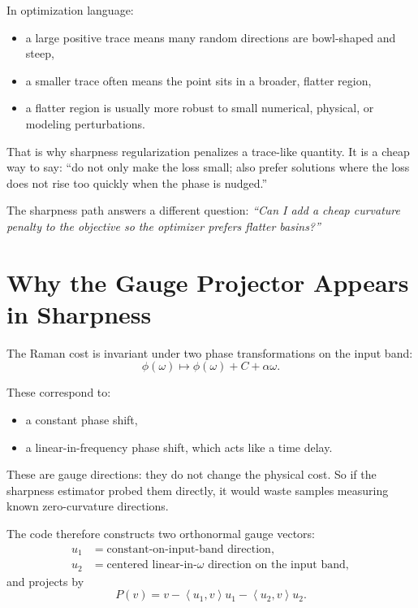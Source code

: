 \documentclass[11pt,letterpaper]{article}
\newcommand{\ip}[2]{\left\langle #1, #2 \right\rangle}
\begin{document}
In optimization language:
\begin{itemize}[leftmargin=*]
  \item a large positive trace means many random directions are bowl-shaped and
  steep,
  \item a smaller trace often means the point sits in a broader, flatter region,
  \item a flatter region is usually more robust to small numerical, physical, or
  modeling perturbations.
\end{itemize}

That is why sharpness regularization penalizes a trace-like quantity. It is a
cheap way to say: ``do not only make the loss small; also prefer solutions where
the loss does not rise too quickly when the phase is nudged.''

\begin{keyidea}
The sharpness path answers a different question:
\emph{``Can I add a cheap curvature penalty to the objective so the optimizer
prefers flatter basins?''}
\end{keyidea}

\section{Why the Gauge Projector Appears in Sharpness}

The Raman cost is invariant under two phase transformations on the input band:
\[
\phi(\omega) \mapsto \phi(\omega) + C + \alpha \omega.
\]

These correspond to:
\begin{itemize}[leftmargin=*]
  \item a constant phase shift,
  \item a linear-in-frequency phase shift, which acts like a time delay.
\end{itemize}

These are gauge directions: they do not change the physical cost. So if the
sharpness estimator probed them directly, it would waste samples measuring
known zero-curvature directions.

The code therefore constructs two orthonormal gauge vectors:
\begin{align*}
u_1 &= \text{constant-on-input-band direction}, \\
u_2 &= \text{centered linear-in-}\omega\text{ direction on the input band},
\end{align*}
and projects by
\[
P(v) = v - \ip{u_1}{v}u_1 - \ip{u_2}{v}u_2.
\]
\end{document}
